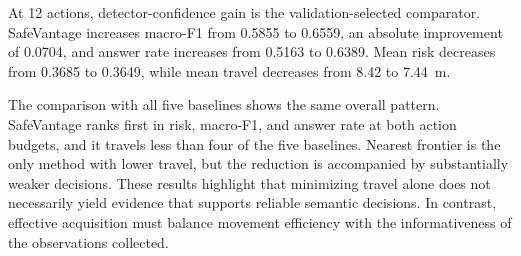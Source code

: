 \documentclass[letterpaper, 10 pt, conference]{ieeeconf}
\newcommand{\method}{SafeVantage}
\begin{document}
    At 12 actions, detector-confidence gain is the validation-selected comparator. \method{} increases macro-F1 from 0.5855 to 0.6559, an absolute improvement of 0.0704, and answer rate increases from 0.5163 to 0.6389. Mean risk decreases from 0.3685 to 0.3649, while mean travel decreases from 8.42 to 7.44~m.

    The comparison with all five baselines shows the same overall pattern. \method{} ranks first in risk, macro-F1, and answer rate at both action budgets, and it travels less than four of the five baselines. Nearest frontier is the only method with lower travel, but  the reduction is accompanied by substantially weaker decisions. These results highlight that minimizing travel alone does not necessarily yield evidence that supports reliable semantic decisions. In contrast, effective acquisition must balance movement efficiency with the informativeness of the observations collected.
\end{document}
